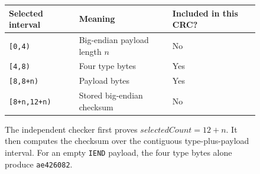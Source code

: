 \begin{figure}[htbp]
  \centering
  \begin{tabular}{l l l}
    \toprule
    Selected interval   & Meaning                       & Included in this CRC? \\
    \midrule
    \texttt{[0,4)}      & Big-endian payload length $n$ & No                    \\
    \texttt{[4,8)}      & Four type bytes               & Yes                   \\
    \texttt{[8,8+n)}    & Payload bytes                 & Yes                   \\
    \texttt{[8+n,12+n)} & Stored big-endian checksum    & No                    \\
    \bottomrule
  \end{tabular}
  \caption{The independent checker first proves $\mathit{selectedCount}=12+n$. It then computes the checksum over the contiguous type-plus-payload interval. For an empty \texttt{IEND} payload, the four type bytes alone produce \texttt{ae426082}.}
  \label{fig:revision-crc-chunk-layout}
\end{figure}
